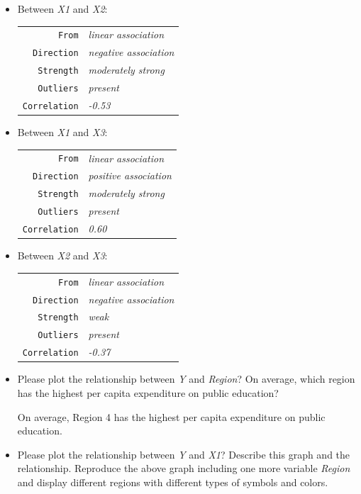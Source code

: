 \documentclass[12pt,letterpaper]{article}
\begin{document}
\begin{itemize}
\begin{tabular}{r|l}
		\end{tabular}
		\item
		Between \emph{X1} and \emph{X2}:
		\begin{tabular}{r|l}
			\texttt{From} &\emph{linear association} \\
			\texttt{Direction} & \emph{negative association}\\
			\texttt{Strength} &\emph{moderately strong} \\
			\texttt{Outliers} &  \emph{present}\\
			\texttt{Correlation} &  \emph{-0.53} \\
		\end{tabular}
		\item
		Between \emph{X1} and \emph{X3}:
		\begin{tabular}{r|l}
			\texttt{From} &\emph{linear association} \\
			\texttt{Direction} & \emph{positive association}\\
			\texttt{Strength} &\emph{moderately strong} \\
			\texttt{Outliers} &  \emph{present}\\
			\texttt{Correlation} &  \emph{0.60} \\
		\end{tabular}
	\item
		Between \emph{X2} and \emph{X3}:
		\begin{tabular}{r|l}
			\texttt{From} &\emph{linear association} \\
			\texttt{Direction} & \emph{negative association}\\
			\texttt{Strength} &\emph{weak} \\
			\texttt{Outliers} &  \emph{present}\\
			\texttt{Correlation} &  \emph{-0.37} \\
		\end{tabular}
		\item
		Please plot the relationship between \emph{Y} and \emph{Region}? On average, which region has the highest per capita expenditure on public education?
		\vspace{.5cm}
		
		On average, Region 4 has the highest per capita expenditure on public education.
		\item
		Please plot the relationship between \emph{Y} and \emph{X1}? Describe this graph and the relationship. Reproduce the above graph including one more variable \emph{Region} and display different regions with different types of symbols and colors.
		
		

\end{itemize}
\end{document}
